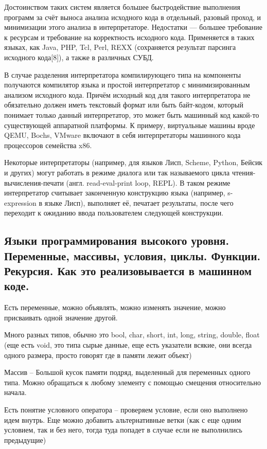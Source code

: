 \documentclass{article}
\begin{document}
Достоинством таких систем является большее быстродействие выполнения программ за счёт выноса анализа исходного кода в отдельный, разовый проход, и минимизации этого анализа в интерпретаторе. Недостатки — большее требование к ресурсам и требование на корректность исходного кода. Применяется в таких языках, как Java, PHP, Tcl, Perl, REXX (сохраняется результат парсинга исходного кода[8]), а также в различных СУБД.

В случае разделения интерпретатора компилирующего типа на компоненты получаются компилятор языка и простой интерпретатор с минимизированным анализом исходного кода. Причём исходный код для такого интерпретатора не обязательно должен иметь текстовый формат или быть байт-кодом, который понимает только данный интерпретатор, это может быть машинный код какой-то существующей аппаратной платформы. К примеру, виртуальные машины вроде QEMU, Bochs, VMware включают в себя интерпретаторы машинного кода процессоров семейства x86.

Некоторые интерпретаторы (например, для языков Лисп, Scheme, Python, Бейсик и других) могут работать в режиме диалога или так называемого цикла чтения-вычисления-печати (англ. read-eval-print loop, REPL). В таком режиме интерпретатор считывает законченную конструкцию языка (например, s-expression в языке Лисп), выполняет её, печатает результаты, после чего переходит к ожиданию ввода пользователем следующей конструкции.

\subsection{Языки программирования высокого уровня. Переменные, массивы, условия, циклы. Функции. Рекурсия.  Как это реализовывается в машинном коде.}

Есть переменные, можно объявлять, можно изменять значение, можно присваивать одной значение другой.

Много разных типов, обычно это bool, char, short, int, long, string, double, float (еще есть void, это типа сырые данные, еще есть указатели всякие, они всегда одного размера, просто говорят где в памяти лежит объект)

Массив -- Большой кусок памяти подряд, выделенный для переменных одного типа. Можно обращаться к любому элементу с помощью смещения относительно начала.

Есть понятие условного оператора -- проверяем условие, если оно выполнено идем внутрь. Еще можно добавить альтернативные ветки (как с еще одним условием, так и без него, тогда туда попадет в случае если не выполнились предыдущие)
\end{document}
